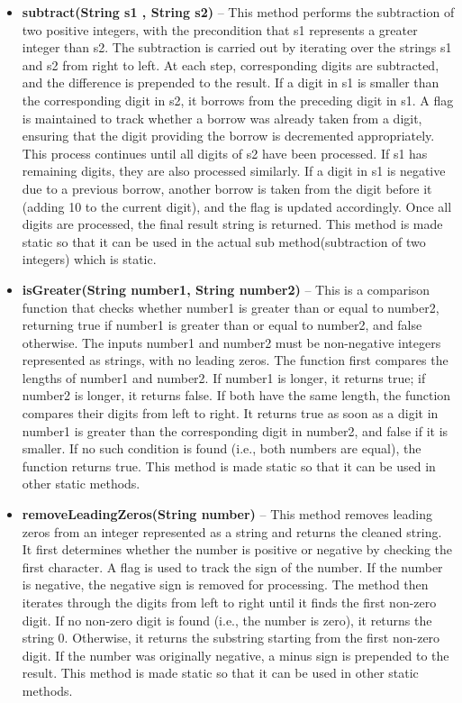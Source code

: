 \documentclass[a4paper,12pt]{article}
\begin{document}
{\begin{itemize}
    \item \textbf{subtract(String s1 , String s2)} -- This method performs the subtraction of two positive integers, with the precondition that s1 represents a greater integer than s2. The subtraction is carried out by iterating over the strings s1 and s2 from right to left. At each step, corresponding digits are subtracted, and the difference is prepended to the result. If a digit in s1 is smaller than the corresponding digit in s2, it borrows from the preceding digit in s1. A flag is maintained to track whether a borrow was already taken from a digit, ensuring that the digit providing the borrow is decremented appropriately. This process continues until all digits of s2 have been processed. If s1 has remaining digits, they are also processed similarly. If a digit in s1 is negative due to a previous borrow, another borrow is taken from the digit before it (adding 10 to the current digit), and the flag is updated accordingly. Once all digits are processed, the final result string is returned. This method is made static so that it can be used in the actual sub method(subtraction of two integers) which is static.\\

    \item \textbf{isGreater(String number1, String number2)} -- This is a comparison function that checks whether number1 is greater than or equal to number2, returning true if number1 is greater than or equal to number2, and false otherwise. The inputs number1 and number2 must be non-negative integers represented as strings, with no leading zeros. The function first compares the lengths of number1 and number2. If number1 is longer, it returns true; if number2 is longer, it returns false. If both have the same length, the function compares their digits from left to right. It returns true as soon as a digit in number1 is greater than the corresponding digit in number2, and false if it is smaller. If no such condition is found (i.e., both numbers are equal), the function returns true. This method is made static so that it can be used in other static methods.\\

    \item \textbf{removeLeadingZeros(String number)} -- This method removes leading zeros from an integer represented as a string and returns the cleaned string. It first determines whether the number is positive or negative by checking the first character. A flag is used to track the sign of the number. If the number is negative, the negative sign is removed for processing. The method then iterates through the digits from left to right until it finds the first non-zero digit. If no non-zero digit is found (i.e., the number is zero), it returns the string $0$. Otherwise, it returns the substring starting from the first non-zero digit. If the number was originally negative, a minus sign is prepended to the result. This method is made static so that it can be used in other static methods.\\


\end{itemize}}
\end{document}
